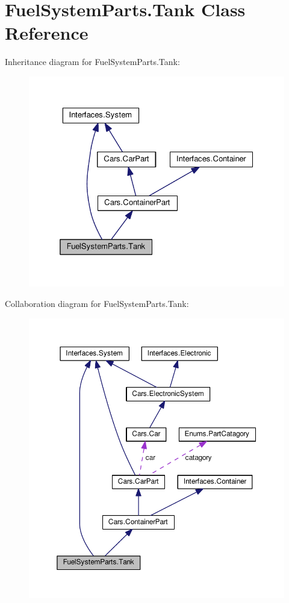 \hypertarget{classFuelSystemParts_1_1Tank}{}\section{Fuel\+System\+Parts.\+Tank Class Reference}
\label{classFuelSystemParts_1_1Tank}


Inheritance diagram for Fuel\+System\+Parts.\+Tank\+:
\nopagebreak
\begin{figure}[H]
\begin{center}
\leavevmode
\includegraphics[width=325pt]{classFuelSystemParts_1_1Tank__inherit__graph}
\end{center}
\end{figure}


Collaboration diagram for Fuel\+System\+Parts.\+Tank\+:
\nopagebreak
\begin{figure}[H]
\begin{center}
\leavevmode
\includegraphics[width=350pt]{classFuelSystemParts_1_1Tank__coll__graph}
\end{center}
\end{figure}
